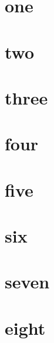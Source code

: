\documentclass[letterpaper]{article}
\begin{document}
\section{one}
\newpage
\section{two}
\newpage
\section{three}
\newpage
\section{four}
\newpage
\section{five}
\newpage
\section{six}
\newpage
\section{seven}
\newpage
\section{eight}
\end{document}
